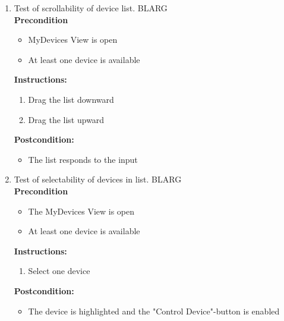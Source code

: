 \documentclass[a4paper]{article}
\newlength{\testlabellength}
\newenvironment{testlist}{\begin{enumerate}[label=\bfseries Instruction \thesubsection.\arabic* , labelindent=0pt, labelwidth=\testlabellength , leftmargin=2cm]}{\end{enumerate}}
\newenvironment{precondition}{
{\color{white}BLARG}\\ 
\textbf{Precondition}
\begin{itemize}[labelindent=0cm, labelwidth=2cm , leftmargin=1cm]
}
{\end{itemize}}
\newenvironment{instruction}{
\textbf{Instructions:}
\begin{enumerate}[label=\bfseries  \arabic*., labelindent=0cm, labelwidth=2cm , leftmargin=1cm]
}
{\end{enumerate}}
\newenvironment{postcondition}{
\textbf{Postcondition:}
\begin{itemize}[labelindent=0cm, labelwidth=2cm , leftmargin=1cm]
}
{\end{itemize}}
\begin{document}
\begin{appendices}
\begin{testlist}
    \item Test of scrollability of device list.
    	\begin{precondition}
    		\item MyDevices View is open
    		\item At least one device is available
    	\end{precondition}
    	\begin{instruction}
			\item Drag the list downward
			\item Drag the list upward
		\end{instruction}
		\begin{postcondition}
			\item The list responds to the input
		\end{postcondition}
   \newpage
    \item Test of selectability of devices in list.
     	\begin{precondition}
    		\item The MyDevices View is open
    		\item At least one device is available
    	\end{precondition}
		\begin{instruction}
			\item Select one device
		\end{instruction}
		\begin{postcondition}
			\item The device is highlighted and the "Control Device"-button is enabled
		\end{postcondition}
   

\end{testlist}
\end{appendices}
\end{document}
